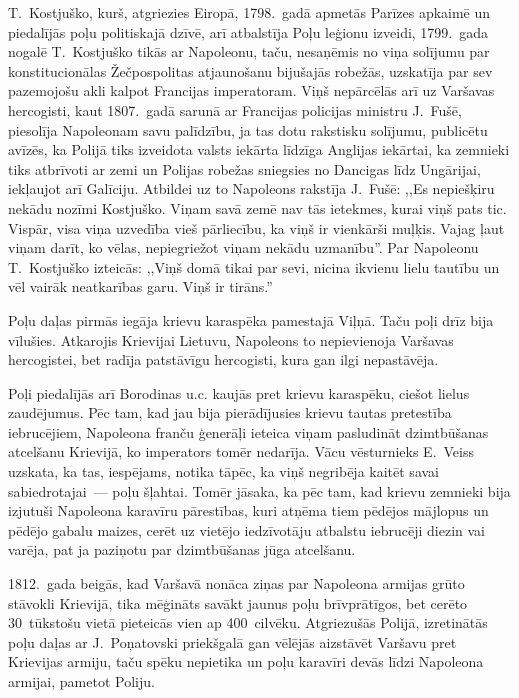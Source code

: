 \documentclass[twoside,a5paper,12pt,fleqn,openany]{extbook}
\begin{document}
T.~Kostjuško, kurš, atgriezies Eiropā, 1798.~gadā apmetās Parīzes apkaimē un piedalījās poļu politiskajā dzīvē, arī atbalstīja Poļu leģionu izveidi, 1799.~gada nogalē T.~Kostjuško tikās ar Napoleonu, taču, nesaņēmis no viņa solījumu par konstitucionālas Žečpospolitas atjaunošanu bijušajās robežās, uzskatīja par sev pazemojošu akli kalpot Francijas imperatoram. Viņš nepārcēlās arī uz Varšavas hercogisti, kaut 1807.~gadā sarunā ar Francijas policijas ministru J.~Fušē, piesolīja Napoleonam savu palīdzību, ja tas dotu rakstisku solījumu, publicētu avīzēs, ka Polijā tiks izveidota valsts iekārta līdzīga Anglijas iekārtai, ka zemnieki tiks atbrīvoti ar zemi un Polijas robežas sniegsies no Dancigas līdz Ungārijai, iekļaujot arī Galīciju. Atbildei uz to Napoleons rakstīja J.~Fušē: ,,Es nepiešķiru nekādu nozīmi Kostjuško. Viņam savā zemē nav tās ietekmes, kurai viņš pats tic. Vispār, visa viņa uzvedība vieš pārliecību, ka viņš ir vienkārši muļķis. Vajag ļaut viņam darīt, ko vēlas, nepiegriežot viņam nekādu uzmanību''. Par Napoleonu T.~Kostjuško izteicās: ,,Viņš domā tikai par sevi, nicina ikvienu lielu tautību un vēl vairāk neatkarības garu. Viņš ir tirāns.''

Poļu daļas pirmās iegāja krievu karaspēka pamestajā Viļņā. Taču poļi drīz bija vīlušies. Atkarojis Krievijai Lietuvu, Napoleons to nepievienoja Varšavas hercogistei, bet radīja patstāvīgu hercogisti, kura gan ilgi nepastāvēja.

Poļi piedalījās arī Borodinas u.c. kaujās pret krievu karaspēku, ciešot lielus zaudējumus. Pēc tam, kad jau bija pierādījusies krievu tautas pretestība iebrucējiem, Napoleona franču ģenerāļi ieteica viņam pasludināt dzimtbūšanas atcelšanu Krievijā, ko imperators tomēr nedarīja. Vācu vēsturnieks E.~Veiss uzskata, ka tas, iespējams, notika tāpēc, ka viņš negribēja kaitēt savai sabiedrotajai~--- poļu šļahtai. Tomēr jāsaka, ka pēc tam, kad krievu zemnieki bija izjutuši Napoleona karavīru pārestības, kuri atņēma tiem pēdējos mājlopus un pēdējo gabalu maizes, cerēt uz vietējo iedzīvotāju atbalstu iebrucēji diezin vai varēja, pat ja paziņotu par dzimtbūšanas jūga atcelšanu.

1812.~gada beigās, kad Varšavā nonāca ziņas par Napoleona armijas grūto stāvokli Krievijā, tika mēģināts savākt jaunus poļu brīvprātīgos, bet cerēto 30~tūkstošu vietā pieteicās vien ap 400~cilvēku. Atgriezušās Polijā, izretinātās poļu daļas ar J.~Poņatovski priekšgalā gan vēlējās aizstāvēt Varšavu pret Krievijas armiju, taču spēku nepietika un poļu karavīri devās līdzi Napoleona armijai, pametot Poliju.
\end{document}
